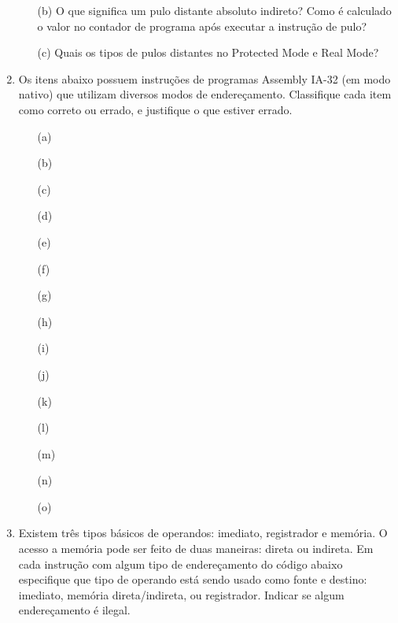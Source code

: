 \begin{enumerate}
\begin{itemize}
        \item [(b)]
        O que significa um pulo distante absoluto indireto?
        Como é calculado o valor no contador de programa 
        após executar a instrução de pulo?

        \item [(c)]
        Quais os tipos de pulos distantes no Protected Mode e Real Mode?
    \end{itemize}

    \item
    Os itens abaixo possuem instruções de programas Assembly IA-32 (em modo nativo) 
    que utilizam diversos modos de endereçamento. 
    Classifique cada item como correto ou errado, e justifique o que estiver errado.
    \begin{itemize}
        \item[(a)] 
        \item[(b)] 
        \item[(c)] 
        \item[(d)] 
        \item[(e)] 
        \item[(f)] 
        \item[(g)] 
        \item[(h)] 
        \item[(i)] 
        \item[(j)]  
        \item[(k)] 
        \item[(l)] 
        \item[(m)] 
        \item[(n)] 
        \item[(o)] 
    \end{itemize}

    \item
    Existem três tipos básicos de operandos: imediato, registrador e memória.
    O acesso a memória pode ser feito de duas maneiras: direta ou indireta.
    Em cada instrução com algum tipo de endereçamento 
    do código abaixo especifique que tipo de operando 
    está sendo usado como fonte e destino:
    imediato, memória direta/indireta, ou registrador.
    Indicar se algum endereçamento é ilegal. 


\end{enumerate}
